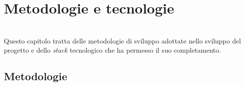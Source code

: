 
\chapter{Metodologie e tecnologie}
\label{cap:metodologie-tecnologie}

\\
Questo capitolo tratta delle metodologie di sviluppo adottate nello sviluppo del progetto e dello \emph{stack} tecnologico che ha permesso il suo completamento.

\section{Metodologie}

